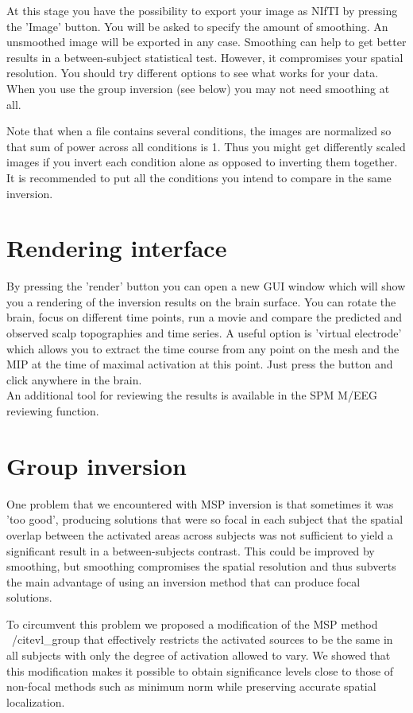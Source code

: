 At this stage you have the possibility to export your image as NIfTI by pressing the 'Image' button. You will be asked to specify the amount of smoothing. An unsmoothed image will
be exported in any case. Smoothing can help to get better results in a between-subject statistical test. However, it compromises your spatial resolution. You should try different options
to see what works for your data. When you use the group inversion (see below) you may not need smoothing at all.

Note that when a file contains several conditions, the images are normalized so that sum of power across all conditions is 1. Thus you might get differently scaled images if you invert each
condition alone as opposed to inverting them together. It is recommended to put all the conditions you intend to compare in the same inversion.

\section{Rendering interface}
By pressing the 'render' button you can open a new GUI window which will show you a rendering of the inversion results on the brain surface. You can rotate the brain, focus on different
time points, run a movie and compare the predicted and observed scalp topographies and time series. A useful option is 'virtual electrode' which allows you to extract the time course from any
point on the mesh and the MIP at the time of maximal activation at this point. Just press the button and click anywhere in the brain.\\
An additional tool for reviewing the results is available in the SPM M/EEG reviewing function.

\section{Group inversion}
One problem that we encountered with MSP inversion is that sometimes it was 'too good', producing solutions that were so focal in each subject that the spatial overlap between the activated
areas across subjects was not sufficient to yield a significant result in a between-subjects contrast. This could be improved by smoothing, but smoothing compromises the spatial resolution
and thus subverts the main advantage of using an inversion method that can produce focal solutions. 

To circumvent this problem we proposed a modification of the MSP method ~/cite{vl\_group}
that effectively restricts the activated sources to be the same in all subjects with only the degree of activation allowed to vary. We showed that this modification makes it possible to
obtain significance levels close to those of non-focal methods such as minimum norm while preserving accurate spatial localization. 

